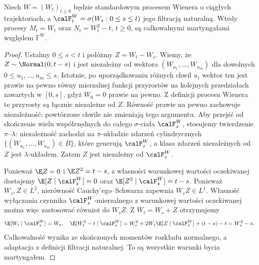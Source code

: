 \begin{twierdzenie}
Niech $W=(W_t)_{t\ge0}$ będzie standardowym procesem
Wienera o ciągłych trajektoriach,
a $\calF_t^W=\sigma(W_s:0\le s\le t)$ jego filtracją
naturalną. Wtedy procesy
$M_t=W_t$ oraz $N_t=W_t^2-t$, $t\ge0$,
są całkowalnymi martyngałami względem $\mathbb F^W$.
\end{twierdzenie}
\begin{proof}
Ustalmy $0\le s<t$ i połóżmy
$Z=W_t-W_s$. Wiemy, że $Z\sim\Normal(0,t-s)$
i jest niezależny od wektora
$(W_{u_1},\ldots,W_{u_m})$ dla dowolnych
$0\le u_1,\ldots,u_m\le s$. Istotnie, po uporządkowaniu
różnych chwil $u_i$ wektor ten jest prawie na pewno
równy mierzalnej funkcji przyrostów na kolejnych
przedziałach zawartych w $[0,s]$, gdyż $W_0=0$ prawie
na pewno. Z definicji procesu Wienera te przyrosty są
łącznie niezależne od $Z$. Równość prawie na pewno
zachowuje niezależność; powtórzone chwile nie zmieniają
tego argumentu.
Aby przejść od skończenie wielu współrzędnych do
całego $\sigma$-ciała $\calF_s^W$, stosujemy
twierdzenie $\pi$--$\lambda$: niezależność zachodzi
na $\pi$-układzie zdarzeń cylindrycznych
$\{(W_{u_1},\ldots,W_{u_m})\in B\}$, które generują
$\calF_s^W$, a klasa zdarzeń niezależnych od $Z$
jest $\lambda$-układem. Zatem $Z$ jest niezależny
od $\calF_s^W$.

Ponieważ $\E Z=0$ i $\E Z^2=t-s$, z własności
warunkowej wartości oczekiwanej dostajemy
$\E[Z\mid\calF_s^W]=0$ oraz
$\E[Z^2\mid\calF_s^W]=t-s$.
Ponieważ $W_s,Z\in L^2$, nierówność Cauchy'ego--Schwarza
zapewnia $W_s Z\in L^1$. Własność wyłączania czynnika
$\calF_s^W$-mierzalnego z warunkowej wartości oczekiwanej
można więc zastosować również do $W_s Z$.
Z $W_t=W_s+Z$ otrzymujemy
\[
\E[W_t\mid\calF_s^W]=W_s,
\quad
\E[W_t^2-t\mid\calF_s^W]
=W_s^2+2W_s\E[Z\mid\calF_s^W]
+(t-s)-t=W_s^2-s.
\]
Całkowalność wynika ze skończonych momentów
rozkładu normalnego, a adaptacja z definicji
filtracji naturalnej. To są wszystkie warunki
bycia martyngałem.
\end{proof}

